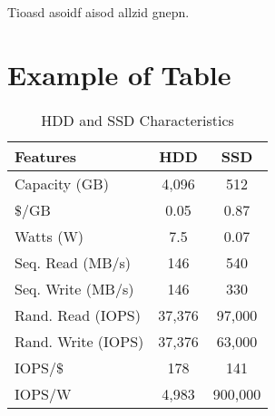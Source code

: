 \begin{savequote}[90mm]
  {\QuoteFont Tioasd asoidf aisod allzid gnepn.}
\end{savequote}

\chapter{Example of Table}
\label{chap:chapter_03}

\lipsum[1]

\begin{singlespace}
\begin{table}[thbp]
\centering
\caption{HDD and SSD Characteristics} \label{dollar}
\begin{tabular}{|l||c|c|} \hline
Features	&	HDD \cite{HDD_Seagate_4TB}	&	SSD \cite{SSD_Samsung_512GB}	\\ \hline \hline
Capacity (GB)	&	4,096	&	512	 \\
$\$$/GB	&	0.05	&	0.87	 \\
Watts (W)	&	7.5	&	0.07	 \\
Seq. Read (MB/s)	&	146	&	540	 \\
Seq. Write (MB/s)	&	146	&	330	 \\
Rand. Read (IOPS)	&	37,376	&	97,000	 \\
Rand. Write (IOPS)	&	37,376	&	63,000	 \\
IOPS/$\$$	&	178	&	141	 \\
IOPS/W	&	4,983	&	900,000	 \\ \hline
\end{tabular}
\end{table}
\end{singlespace}



\lipsum[1-4]

